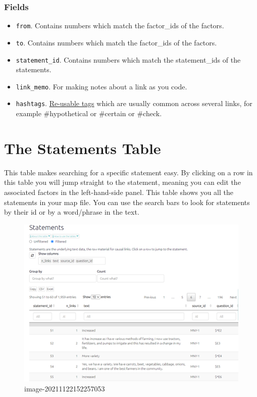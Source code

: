 \documentclass[
]{book}
\providecommand{\tightlist}{%
  \setlength{\itemsep}{0pt}\setlength{\parskip}{0pt}}
\begin{document}
\hypertarget{fields}{%
\subsection{Fields}\label{fields}}

\begin{itemize}
\tightlist
\item
  \texttt{from}. Contains numbers which match the factor\_ids of the factors.
\item
  \texttt{to}. Contains numbers which match the factor\_ids of the factors.
\item
  \texttt{statement\_id}. Contains numbers which match the statement\_ids of the statements.
\item
  \texttt{link\_memo}. For making notes about a link as you code.
\item
  \texttt{hashtags}. \protect\hyperlink{xhashtags}{Re-usable tags} which are usually common across several links, for example \#hypothetical or \#certain or \#check.
\end{itemize}

\hypertarget{xthe-statements-table}{%
\chapter{The Statements Table}\label{xthe-statements-table}}

This table makes searching for a specific statement easy. By clicking on a row in this table you will jump straight to the statement, meaning you can edit the associated factors in the left-hand-side panel. This table shows you all the statements in your map file. You can use the search bars to look for statements by their id or by a word/phrase in the text.

\begin{figure}
\centering
\includegraphics[width=6.77083in,height=\textheight]{_assets/image-20211122152257053.png}
\caption{image-20211122152257053}
\end{figure}
\end{document}
